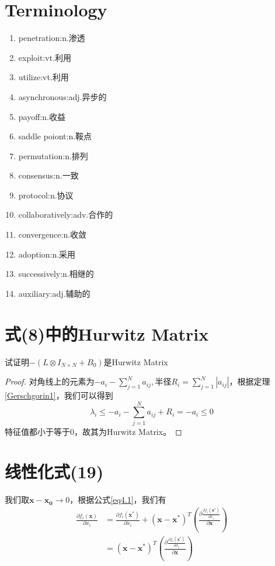 \documentclass[lang=cn,10pt]{elegantbook}
\newcommand\bv[1]{\boldsymbol{#1}}
\begin{document}
\section{Terminology}
\begin{enumerate}
	\item penetration:n.渗透
	\item exploit:vt.利用
	\item utilize:vt.利用
	\item asynchronous:adj.异步的
	\item payoff:n.收益
	\item saddle poiont:n.鞍点
	\item permutation:n.排列
	\item consensus:n.一致
	\item protocol:n.协议
	\item collaboratively:adv.合作的
	\item convergence:n.收敛
	\item adoption:n.采用
	\item successively:n.相继的
	\item auxiliary:adj.辅助的
\end{enumerate}

\section{式(8)中的Hurwitz Matrix}
试证明$-(L\otimes I_{N\times N}+B_{0})$是Hurwitz Matrix
\begin{proof}
	对角线上的元素为$-a_{i}-\sum_{j=1}^{N}a_{ij},半径R_i = \sum_{j=1}^{N}|a_{ij}|$，根据定理\ref{Gerschgorin1}，我们可以得到
	\begin{equation*}
		\lambda_i \leq -a_{i}-\sum_{j=1}^{N}a_{ij} + R_i = -a_{i}\leq 0
	\end{equation*}
	特征值都小于等于0，故其为Hurwitz Matrix。
\end{proof}





\section{线性化式(19)}
我们取$\bv{x-x_0} \rightarrow 0$，根据公式\ref{eq4.1}，我们有
\begin{equation*}
	\begin{aligned}
		\frac{\partial f_i(\bv{x})}{\partial x_i} & = \frac{\partial f_i(\bv{x^{*}})}{\partial x_i} +
		(\bv{x-x^{*}})^T(\frac{\partial \frac{\partial f_i(\bv{x^{*}})}{\partial x_i}}{\partial \bv{x}}) \\
		                                          & =
		(\bv{x-x^{*}})^T(\frac{\partial \frac{\partial f_i(\bv{x^{*}})}{\partial x_i}}{\partial \bv{x}})
	\end{aligned}
\end{equation*}
\end{document}
